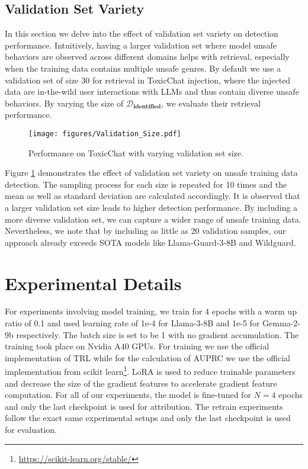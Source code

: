 \documentclass[11pt]{article}
\begin{document}
\subsection{Validation Set Variety} \label{analysis:validation_set}
In this section we delve into the effect of validation set variety on detection performance. Intuitively, having a larger validation set where model unsafe behaviors are observed across different domains helps with retrieval, especially when the training data contains multiple unsafe genres. By default we use a validation set of size 30 for retrieval in ToxicChat injection, where the injected data are in-the-wild user interactions with LLMs and thus contain diverse unsafe behaviors. By varying the size of $\mathcal{D}_{\textbf{identified}}$, we evaluate their retrieval performance.

\begin{figure}[h!]
    \centering
    \texttt{[image: figures/Validation\_Size.pdf]}
    \caption{Performance on ToxicChat with varying validation set size.}
    \label{fig:validation_size}
\end{figure}

Figure \ref{fig:validation_size} demonstrates the effect of validation set variety on unsafe training data detection. The sampling process for each size is repeated for 10 times and the mean as well as standard deviation are calculated accordingly. It is observed that a larger validation set size leads to higher detection performance. By including a more diverse validation set, we can capture a wider range of unsafe training data. Nevertheless, we note that by including as little as 20 validation samples, our approach already exceeds SOTA models like Llama-Guard-3-8B and Wildguard.

\section{Experimental Details}
For experiments involving model training, we train for 4 epochs with a warm up ratio of 0.1 and used learning rate of 1e-4 for Llama-3-8B and 1e-5 for Gemma-2-9b respectively. The batch size is set to be 1 with no gradient accumulation. The training took place on Nvidia A40 GPUs. For training we use the official implementation of TRL \cite{vonwerra2022trl} while for the calculation of AUPRC we use the official implementation from scikit learn\footnote{\url{https://scikit-learn.org/stable/}}.
LoRA \cite{hu2021loralowrankadaptationlarge} is used to reduce trainable parameters and decrease the size of the gradient features to accelerate gradient feature computation. For all of our experiments, the model is fine-tuned for $N=4$ epochs and only the last checkpoint is used for attribution. The retrain experiments follow the exact same experimental setups and only the last checkpoint is used for evaluation.
\end{document}
